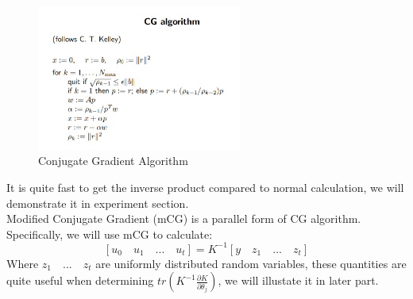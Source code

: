 \documentclass{article}
\begin{document}
   \begin{figure}[H]
	\begin{center}
		\includegraphics[width=0.6\textwidth]{CG}
	\end{center}
	\caption{Conjugate Gradient Algorithm}
	\label{fig5}
\end{figure}
It is quite fast to get the inverse product compared to normal calculation, we will demonstrate it in experiment section.\\
Modified Conjugate Gradient (mCG) is a parallel form of CG algorithm. Specifically, we will use mCG to calculate:
\begin{equation}\label{equ1}
[u_0 \quad u_1 \quad ... \quad u_t]=K^{-1}[y \quad z_1 \quad ... \quad z_t]
\end{equation} 
Where $z_1 \quad ... \quad z_t$ are uniformly distributed random variables, these quantities are quite useful when determining  $tr(K^{-1}\frac{\partial K}{\partial \theta_j})$, we will illustate it in later part.
\end{document}
